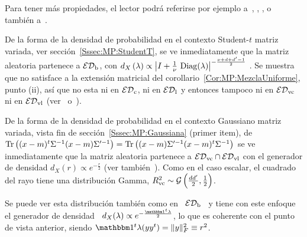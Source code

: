 Para  tener   m\'as  propiedades,  el  lector  podr\'a   referirse  por  ejemplo
a~\cite{FanChe84},  \cite[\S~9.2 \&~9.3]{GupNag99},  \cite[\S~13.2]{BilBre99}, o
tambi\'en a~\cite{And03, Daw78, Daw81, LibrosABuscar}.


\begin{ejemplo}\label{Ej:MP:StudentTMatriz}
%
  De la forma  de la densidad de probabilidad en  el contexto Student-$t$ matriz
  variada,  ver secci\'on~\ref{Sssec:MP:StudentT}, se  ve inmediatamente  que la
  matriz  aleatoria  partenece  a  $\mathcal{ED}_{\mathrm{b}}$, con  $d_X\left(  \lambda  \right)
  \propto    \left|   I   +    \frac{1}{\nu}   \,    \operatorname{Diag}(\lambda)   \right|^{-
    \frac{\nu+d+d'-1}{2}}$  .  Se  muestra  que no  satisface  a la  extensi\'on
  matricial del corollario~\ref{Cor:MP:MezclaUniforme}, punto (ii), as\'i que no
  esta ni en  $\mathcal{ED}_{\mathrm{c}}$, ni en $\mathcal{ED}_{\mathrm{l}}$ y entonces  tampoco ni en $\mathcal{ED}_{\mathrm{vc}}$
  ni    en   $\mathcal{ED}_{\mathrm{vl}}$    (ver~\cite[Ej.~1]{FanChe84}    o~\cite[ejemplo   del
  ec.~(2.3)]{Kar81}).
%
\end{ejemplo}

\begin{ejemplo}\label{Ej:MP:GaussianaMatriz}
%
  De la  forma de la  densidad de probabilidad  en el contexto  Gaussiano matriz
  variada,  vista fin  de secci\'on~\ref{Sssec:MP:Gaussiana}  (primer  item), de
  $\operatorname{Tr} \left( (x-m)^t \Sigma^{-1} (x-m)  \Sigma'^{-1} \right) = \operatorname{Tr} \left( (x-m)
    \Sigma'^{-1} (x-m)^t \Sigma^{-1} \right)$ se ve inmediatamente que la matriz
  aleatoria partenece a $\mathcal{ED}_{\mathrm{vc}} \cap  \mathcal{ED}_{\mathrm{vl}}$ con el generador de densidad
  $d_X(r)   \propto  e^{-\frac{r}{2}}$  (ver   tambi\'en~\cite{Daw81,  FanKot99,
    FanNad04}).   Como  en el  caso  escalar, el  cuadrado  del  rayo tiene  una
  distribuci\'on  Gamma,  $R_{\mathrm{vc}}^2  \sim  \mathcal{G}\left( \frac{d  d'}{2}  ,  \frac12
  \right)$.

  Se puede ver esta distribuci\'on tambi\'en  como en \ $\mathcal{ED}_{\mathrm{b}}$ \ y tiene con
  este enfoque el generador  de densidad \ $d_X(\lambda) \propto e^{-\frac{\un^t
      \lambda}{2}}$, lo que es coherente  con el punto de vista anterior, siendo
  $\un^t \lambda(y y^t) = \| y \|_F^2 \equiv r^2$.
\end{ejemplo}

